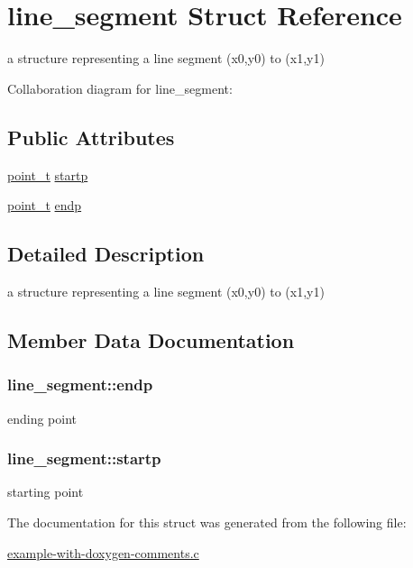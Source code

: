 \hypertarget{structline__segment}{}\section{line\+\_\+segment Struct Reference}
\label{structline__segment}


a structure representing a line segment (x0,y0) to (x1,y1)  




Collaboration diagram for line\+\_\+segment\+:
\subsection*{Public Attributes}
\begin{DoxyCompactItemize}
\item 
\hyperlink{example-with-doxygen-comments_8c_a7a31ff9ffbde2c44d8a5b7f56faeed48}{point\+\_\+t} \hyperlink{structline__segment_a26455a3ddc109e4dc4f2fb4cfb2e43dd}{startp}
\item 
\hyperlink{example-with-doxygen-comments_8c_a7a31ff9ffbde2c44d8a5b7f56faeed48}{point\+\_\+t} \hyperlink{structline__segment_a384435a4b416d0fea374de8a7a7892c9}{endp}
\end{DoxyCompactItemize}


\subsection{Detailed Description}
a structure representing a line segment (x0,y0) to (x1,y1) 

\subsection{Member Data Documentation}
\subsubsection[{\texorpdfstring{endp}{endp}}]{ line\+\_\+segment\+::endp}\hypertarget{structline__segment_a384435a4b416d0fea374de8a7a7892c9}{}\label{structline__segment_a384435a4b416d0fea374de8a7a7892c9}
ending point 
\subsubsection[{\texorpdfstring{startp}{startp}}]{ line\+\_\+segment\+::startp}\hypertarget{structline__segment_a26455a3ddc109e4dc4f2fb4cfb2e43dd}{}\label{structline__segment_a26455a3ddc109e4dc4f2fb4cfb2e43dd}
starting point 

The documentation for this struct was generated from the following file\+:\begin{DoxyCompactItemize}
\item 
\hyperlink{example-with-doxygen-comments_8c}{example-\/with-\/doxygen-\/comments.\+c}\end{DoxyCompactItemize}
